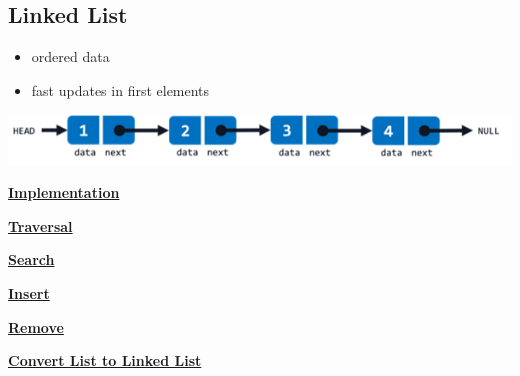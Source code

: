 \subsection{Linked List}
    \begin{itemize}
        \item ordered data
        \item fast updates in first elements
    \end{itemize}
    \includegraphics*[width = 0.9\linewidth]{src/5_data_structure/images/linked_list.png}

    {\centering\underline{\textbf{Implementation}} \par}
        

    {\centering\underline{\textbf{Traversal}} \par}
        

    {\centering\underline{\textbf{Search}} \par}
        

    {\centering\underline{\textbf{Insert}} \par}
        

    {\centering\underline{\textbf{Remove}} \par}
        
    
    {\centering\underline{\textbf{Convert List to Linked List}} \par}
        
